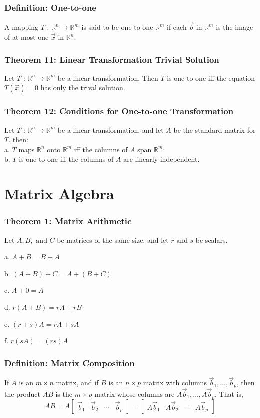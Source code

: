 \documentclass{article}
\begin{document}
\subsubsection*{Definition: One-to-one}
A mapping $T$ : $\mathbb{R}^n \xrightarrow{} \mathbb{R}^m$ is said to be one-to-one $\mathbb{R}^m$ if each $\vec b$ in $\mathbb{R}^m$ is the image of at most one $\vec x$ in $\mathbb{R}^n$.

\subsubsection*{Theorem 11: Linear Transformation Trivial Solution}
Let $T$ : $\mathbb{R}^n \xrightarrow{} \mathbb{R}^m$ be a linear transformation. Then $T$ is one-to-one iff the equation $T(\vec x) = 0$ has only the trival solution. 

\subsubsection*{Theorem 12: Conditions for One-to-one Transformation}
Let $T$ : $\mathbb{R}^n \xrightarrow{} \mathbb{R}^m$ be a linear transformation, and let $A$ be the standard matrix for $T$. then:
\\a. $T$ maps $\mathbb{R}^n$ onto $\mathbb{R}^m$ iff the columns of $A$ span $\mathbb{R}^m$:
\\b. $T$ is one-to-one iff the columns of $A$ are linearly independent. 

\section{Matrix Algebra}
\subsubsection*{Theorem 1: Matrix Arithmetic}
Let $A,B,\text{ and }C$ be matrices of the same size, and let $r \text{ and } s$ be scalars. 

a. $A + B = B + A$

b. $(A+B) + C = A + (B+C)$

c. $A + 0 = A$

d. $r(A+B) = rA + rB$

e. $(r+s)A = rA + sA$

f. $r(sA) = (rs)A$
\subsubsection*{Definition: Matrix Composition}
If $A$ is an $m \times n$ matrix, and if $B$ is an $n \times p$ matrix with columns $\vec b_1 , \dots, \vec b_p$, then the product $AB$ is the $m \times p$ matrix whose columns are $A \vec b_1, \dots , A \vec b_p$. That is, 
$$AB = A \begin{bmatrix}
    \vec b_1 & \vec b_2 & \cdots & \vec b_p
\end{bmatrix}
= \begin{bmatrix}
    A \vec b_1 & A \vec b_2 & \cdots & A \vec b_p
\end{bmatrix}$$
\end{document}
